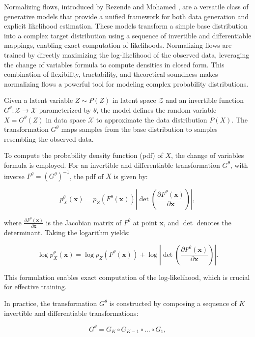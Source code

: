 Normalizing flows, introduced by Rezende and Mohamed \cite{rezende2015variational}, are a versatile class of generative models that provide a unified framework for both data generation and explicit likelihood estimation. These models transform a simple base distribution into a complex target distribution using a sequence of invertible and differentiable mappings, enabling exact computation of likelihoods. Normalizing flows are trained by directly maximizing the log-likelihood of the observed data, leveraging the change of variables formula to compute densities in closed form. This combination of flexibility, tractability, and theoretical soundness makes normalizing flows a powerful tool for modeling complex probability distributions.

Given a latent variable $Z \sim P(Z)$ in latent space $\mathcal{Z}$ and an invertible function $G^\theta: \mathcal{Z} \rightarrow \mathcal{X}$ parameterized by $\theta$, the model defines the random variable $X = G^\theta(Z)$ in data space $\mathcal{X}$ to approximate the data distribution $P(X)$. The transformation $G^\theta$ maps samples from the base distribution to samples resembling the observed data.

To compute the probability density function (pdf) of $X$, the change of variables formula is employed. For an invertible and differentiable transformation $G^\theta$, with inverse $F^\theta = (G^\theta)^{-1}$, the pdf of $X$ is given by:

\[
p^\theta_X(\mathbf{x}) = p_Z\left(F^\theta(\mathbf{x})\right) \left| \det \left( \frac{\partial F^\theta(\mathbf{x})}{\partial \mathbf{x}} \right) \right|,
\]

\noindent where $\frac{\partial F^\theta(\mathbf{x})}{\partial \mathbf{x}}$ is the Jacobian matrix of $F^\theta$ at point $\mathbf{x}$, and $\det$ denotes the determinant. Taking the logarithm yields:

\[
\log p^\theta_X(\mathbf{x}) = \log p_Z\left(F^\theta(\mathbf{x})\right) + \log \left| \det \left( \frac{\partial F^\theta(\mathbf{x})}{\partial \mathbf{x}} \right) \right|.
\]

This formulation enables exact computation of the log-likelihood, which is crucial for effective training.

In practice, the transformation $G^\theta$ is constructed by composing a sequence of $K$ invertible and differentiable transformations:

\[
G^\theta = G_K \circ G_{K-1} \circ \dots \circ G_1,
\]

